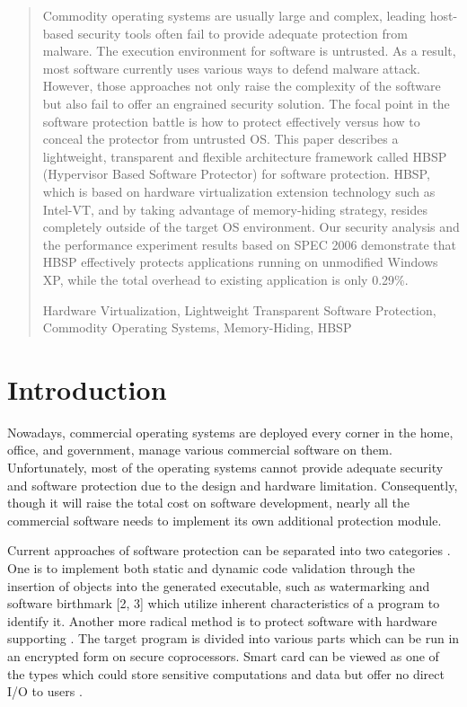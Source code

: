 \documentclass[conference]{IEEEtran}
\begin{document}
\begin{abstract}
Commodity operating systems are usually large and complex, leading
host-based security tools often fail to provide adequate
protection from malware. The execution environment for software is
untrusted. As a result, most software currently uses various ways
to defend malware attack. However, those approaches not only raise
the complexity of the software but also fail to offer an engrained
security solution. The focal point in the software protection
battle is how to protect effectively versus how to conceal the
protector from untrusted OS. This paper describes a lightweight,
transparent and flexible architecture framework called HBSP
(Hypervisor Based Software Protector) for software protection.
HBSP, which is based on hardware virtualization extension
technology such as Intel-VT, and by taking advantage of
memory-hiding strategy, resides completely outside of the target
OS environment.  Our security analysis and the performance
experiment results based on SPEC 2006 demonstrate that HBSP
effectively protects applications running on unmodified Windows
XP, while the total overhead to existing application is only
0.29\%.

\bigskip

\begin{IEEEkeywords}
Hardware Virtualization, Lightweight Transparent Software
Protection, Commodity Operating Systems, Memory-Hiding, HBSP
\end{IEEEkeywords}

\end{abstract}

\IEEEpeerreviewmaketitle

\bigskip

\section{Introduction}


Nowadays, commercial operating systems are deployed every corner
in the home, office, and government, manage various commercial
software on them. Unfortunately, most of the operating systems
cannot provide adequate security and software protection due to
the design and hardware limitation. Consequently, though it will
raise the total cost on software development, nearly all the
commercial software needs to implement its own additional
protection module.

Current approaches of software protection can be separated into
two categories \cite{IEEEhowto:1}. One is to implement both static
and dynamic code validation through the insertion of objects into
the generated executable, such as watermarking and software
birthmark [2, 3] which utilize inherent characteristics of a
program to identify it. Another more radical method is to protect
software with hardware supporting \cite{IEEEhowto:20}. The target
program is divided into various parts which can be run in an
encrypted form on secure coprocessors. Smart card can be viewed as
one of the types which could store sensitive computations and data
but offer no direct I/O to users \cite{IEEEhowto:4}.
\end{document}
